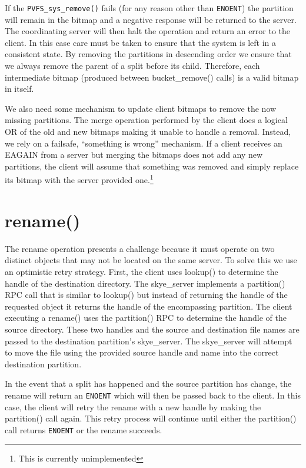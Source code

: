 \documentclass[letterpaper]{article}
\newcommand{\code}[1]{\texttt{#1}}
\begin{document}
If the \code{PVFS\_\-sys\_\-remove()} fails (for any reason other than \code{ENOENT}) the partition
will remain in the bitmap and a negative response will be returned to the
server.  The coordinating server will then halt the operation and return an
error to the client.  In this case care must be taken to ensure that the system
is left in a consistent state.  By removing the partitions in descending order
we ensure that we always remove the parent of a split before its child.
Therefore, each intermediate bitmap (produced between bucket\_\-remove() calls) is
a valid bitmap in itself.

We also need some mechanism to update client bitmaps to remove the now missing
partitions.  The merge operation performed by the client does a logical
OR of the old and new bitmaps making it unable to handle a removal.  Instead, we
rely on a failsafe, ``something is wrong'' mechanism.  If a client receives an
EAGAIN from a server but merging the bitmaps does not add any new partitions,
the client will assume that something was removed and simply replace its bitmap
with the server provided one.\footnote{This is currently unimplemented}

\section{rename()}
The rename operation presents a challenge because it must operate on two distinct
objects that may not be located on the same server.  To solve this we use an
optimistic retry strategy.  First, the client uses lookup() to determine the
handle of the destination directory.  The skye\_\-server implements a partition()
RPC call that is similar to lookup() but instead of returning the handle of the
requested object it returns the handle of the encompassing partition.  The
client executing a rename() uses the partition() RPC to determine the handle of
the source directory.  These two handles and the source and destination file
names are passed to the destination partition's skye\_\-server.  The skye\_\-server
will attempt to move the file using the provided source handle and name into the
correct destination partition.  

In the event that a split has happened and the source partition has change, the
rename will return an \code{ENOENT} which will then be passed back to the client.  In
this case, the client will retry the rename with a new handle by making the
partition() call again.  This retry process will continue until either the
partition() call returns \code{ENOENT} or the rename succeeds.  
\end{document}
